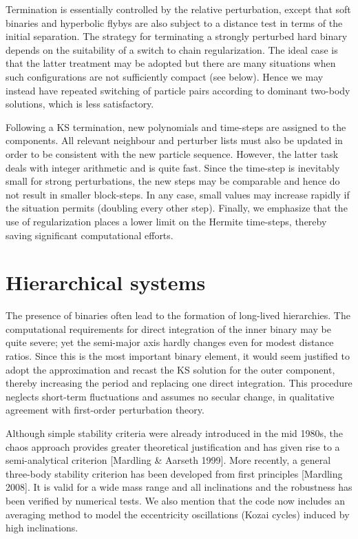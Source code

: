 \documentclass[12pt]{article}
\begin{document}
Termination is essentially controlled by the relative perturbation, except
that soft binaries and hyperbolic flybys are also subject to a distance test
in terms of the initial separation.
The strategy for terminating a strongly perturbed hard binary depends on the
suitability of a switch to chain regularization.
The ideal case is that the latter treatment may be adopted but there are many
situations when such configurations are not sufficiently compact (see below).
Hence we may instead have repeated switching of particle pairs according to
dominant two-body solutions, which is less satisfactory.

Following a KS termination, new polynomials and time-steps are assigned to
the components.
All relevant neighbour and perturber lists must also be updated in order to
be consistent with the new particle sequence.
However, the latter task deals with integer arithmetic and is quite fast.
Since the \cm time-step is inevitably small for strong perturbations, the new
steps may be comparable and hence do not result in smaller block-steps.
In any case, small values may increase rapidly if the situation permits
(\ie doubling every other step).
Finally, we emphasize that the use of regularization places a lower limit on
the Hermite time-steps, thereby saving significant computational efforts.

\section{Hierarchical systems}

The presence of binaries often lead to the formation of long-lived
hierarchies.
The computational requirements for direct integration of the inner binary may
be quite severe; yet the semi-major axis hardly changes even for modest
distance ratios.
Since this is the most important binary element, it would seem justified to
adopt the \cm approximation and recast the KS solution for the outer
component, thereby increasing the period and replacing one direct
integration.
This procedure neglects short-term fluctuations and assumes no secular
change, in qualitative agreement with first-order perturbation theory.

Although simple stability criteria were already introduced in the mid 1980s,
the chaos approach provides greater theoretical justification and has given
rise to a semi-analytical criterion [Mardling \& Aarseth 1999].
More recently, a general three-body stability criterion has been developed
from first principles [Mardling 2008].
It is valid for a wide mass range and all inclinations and the robustness
has been verified by numerical tests.
We also mention that the code now includes an averaging method
to model the eccentricity oscillations (Kozai cycles) induced by high
inclinations.
\end{document}
